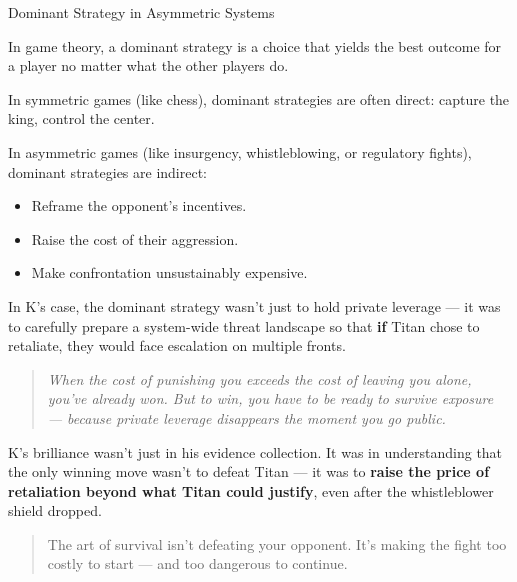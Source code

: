 \begin{HistoricalSidebar}{Dominant Strategy in Asymmetric Systems}

In game theory, a dominant strategy is a choice that yields the best outcome for a player no matter what the other players do.

\medskip

In symmetric games (like chess), dominant strategies are often direct: capture the king, control the center.

In asymmetric games (like insurgency, whistleblowing, or regulatory fights), dominant strategies are indirect:

\begin{itemize}
    \item Reframe the opponent’s incentives.
    \item Raise the cost of their aggression.
    \item Make confrontation unsustainably expensive.
\end{itemize}

\medskip

In K’s case, the dominant strategy wasn’t just to hold private leverage —  
it was to carefully prepare a system-wide threat landscape so that \textbf{if} Titan chose to retaliate,  
they would face escalation on multiple fronts.

\medskip

\begin{quote}
    \textit{When the cost of punishing you exceeds the cost of leaving you alone, you’ve already won.  
    But to win, you have to be ready to survive exposure — because private leverage disappears the moment you go public.}
\end{quote}

\end{HistoricalSidebar}

\medskip

K’s brilliance wasn’t just in his evidence collection.
It was in understanding that the only winning move wasn’t to defeat Titan —
it was to \textbf{raise the price of retaliation beyond what Titan could justify},  
even after the whistleblower shield dropped.

\begin{quote}
    The art of survival isn’t defeating your opponent.  
    It’s making the fight too costly to start — and too dangerous to continue.
\end{quote}



